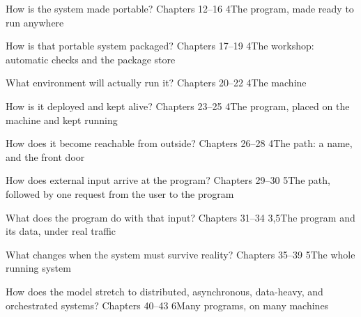 \documentclass[11pt, twoside, openright]{book}
\begin{document}
  {How is the system made portable?}
  {Chapters 12–16}
  {4}{The program, made ready to run anywhere}






  {How is that portable system packaged?}
  {Chapters 17–19}
  {4}{The workshop: automatic checks and the package store}




  {What environment will actually run it?}
  {Chapters 20–22}
  {4}{The machine}




  {How is it deployed and kept alive?}
  {Chapters 23–25}
  {4}{The program, placed on the machine and kept running}




  {How does it become reachable from outside?}
  {Chapters 26–28}
  {4}{The path: a name, and the front door}




  {How does external input arrive at the program?}
  {Chapters 29–30}
  {5}{The path, followed by one request from the user to the program}



  {What does the program do with that input?}
  {Chapters 31–34}
  {3,5}{The program and its data, under real traffic}





  {What changes when the system must survive reality?}
  {Chapters 35–39}
  {5}{The whole running system}






  {How does the model stretch to distributed, asynchronous, data-heavy, and orchestrated systems?}
  {Chapters 40–43}
  {6}{Many programs, on many machines}




\end{document}

